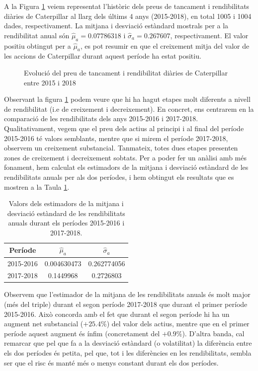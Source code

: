 \documentclass{article}
\numberwithin{table}{section}
\numberwithin{figure}{section}
\numberwithin{equation}{section}
\begin{document}
A la Figura \ref{fig:serie preus} veiem representat l'històric dels preus de tancament i rendibilitats diàries de Caterpillar al llarg dels últims 4 anys (2015-2018), en total 1005 i 1004 dades, respectivament. La mitjana i desviació estàndard mostrals per a la rendibilitat anual són $\hat{\mu}_a=0.07786318$ i $\hat{\sigma}_a=0.267607$, respectivament. El valor positiu obtingut per a $\hat{\mu}_a$, es pot resumir en que el creixement mitja del valor de les accions de Caterpillar durant aquest període ha estat positiu.\\
\begin{figure}[H]
	\centering \sffamily \small
	
	\caption{Evolució del preu de tancament i rendibilitat diàries de Caterpillar entre 2015 i 2018}
	\label{fig:serie preus}
\end{figure}

Observant la figura \ref{fig:serie preus} podem veure que hi ha hagut etapes molt diferents a nivell de rendibilitat (i.e de creixement i decreixement). En concret, ens centrarem en la comparació de les rendibilitats dels anys 2015-2016 i 2017-2018.\\
Qualitativament, vegem que el preu dels actius al principi i al final del període 2015-2016 té valors semblants, mentre que si mirem el període 2017-2018, observem un creixement substancial. Tanmateix, totes dues etapes presenten zones de creixement i decreixement sobtats. Per a poder fer un anàlisi amb més fonament, hem calculat els estimadors de la  mitjana i desviació estàndard de les rendibilitats anuals per als dos períodes, i hem obtingut els resultats que es mostren a la Taula \ref{tb:estim}.

\begin{table}[H]
\centering
\caption{Valors dels estimadors de la mitjana i desviació estàndard de les rendibilitats anuals durant els períodes 2015-2016 i 2017-2018.}
\begin{tabular}{|c|c|c|}
\hline
Període   & $\hat{\mu}_a$& $\hat{\sigma}_a$      \\ \hline
2015-2016 & 0.004630473 & 0.262774056 \\ \hline
2017-2018 & 0.1449968   & 0.2726803   \\ \hline
\end{tabular}
\label{tb:estim}
\end{table}

Observem que l'estimador de la mitjana de les rendibilitats anuals és molt major (més del triple) durant el segon període 2017-2018 que durant el primer període 2015-2016. Això concorda amb el fet que durant el segon període hi ha un augment net substancial ($+25.4\%$) del valor dels actius, mentre que en el primer període aquest augment és ínfim (concretament del $+0.9\%$). D'altra banda, cal remarcar que pel que fa a la desviació estàndard (o volatilitat) la diferència entre els dos períodes és petita, pel que, tot i les diferències en les rendibilitats, sembla ser que el risc és manté més o menys constant durant els dos períodes.\\
\end{document}

